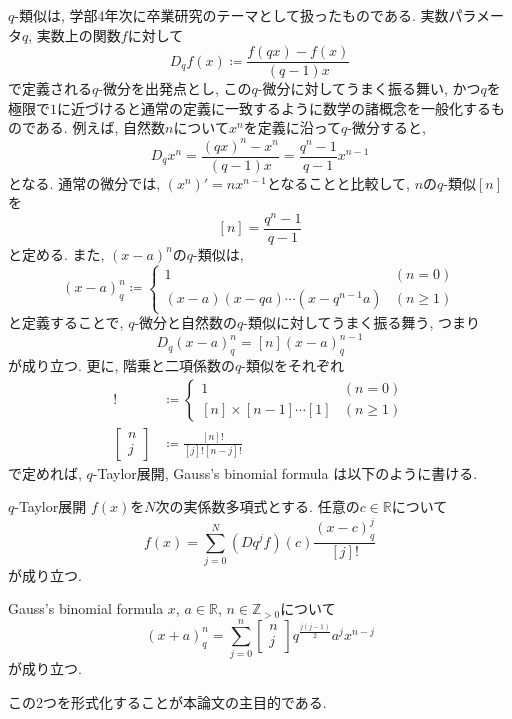\documentclass[11pt]{jsreport}
\theoremstyle{mystyle}
\newcommand{\Z}{\mathbb{Z}}
\newcommand{\R}{\mathbb{R}}
\newcommand{\qcoe}[2]{\left[\begin{array}{ccc}#1\\#2\end{array}\right]}
\newcommand{\0}{\textbf{0}}
\newcommand{\1}{\textbf{1}}
\newcommand{\2}{\textbf{2}}
\begin{document}
$q$-類似は, 学部4年次に卒業研究のテーマとして扱ったものである. 実数パラメータ$q$, 実数上の関数$f$に対して
\[
  D_q f(x) \coloneqq \frac{f(qx) - f(x)}{(q - 1) x}
\]
で定義される$q$-微分を出発点とし, この$q$-微分に対してうまく振る舞い, かつ$q$を極限で$1$に近づけると通常の定義に一致するように数学の諸概念を一般化するものである.
例えば, 自然数$n$について$x^n$を定義に沿って$q$-微分すると, 
\[
  D_q x^n = \frac{(qx)^n - x^n}{(q - 1) x} = \frac{q^n - 1}{q - 1} x^{n - 1}
\]
となる. 通常の微分では, $(x^n)' = n x^{n - 1}$となることと比較して, $n$の$q$-類似$[n]$を
\[
  [n] = \frac{q^n - 1}{q - 1}
\]
と定める. また, $(x - a)^n$の$q$-類似は, 
\[
  (x - a)^n_q \coloneqq \begin{cases}
                                  1 & (n = 0) \\
                                  (x - a) (x - qa) \cdots (x - q^{n - 1} a) & (n \ge 1)
                                \end{cases}
\]
と定義することで, $q$-微分と自然数の$q$-類似に対してうまく振る舞う, つまり
\[
  D_q (x - a)^n_q = [n](x - a)^{n - 1}_q
\]
が成り立つ. 更に, 階乗と二項係数の$q$-類似をそれぞれ
\begin{align*}
  [n]! &\coloneqq \begin{cases}
                        1 & (n = 0)\\
                        [n] \times [n   - 1] \cdots [1] & (n \ge 1)
                      \end{cases}\\
  \qcoe{n}{j} &\coloneqq \frac{[n]!}{[j]![n - j]!}
\end{align*}
で定めれば, $q$-Taylor展開, Gauss's binomial formula は以下のように書ける. 
\begin{itembox}{$q$-Taylor展開}
  $f(x)$を$N$次の実係数多項式とする. 任意の$c \in \R$について
  \[
    f(x) = \sum_{j = 0}^N (Dq^j f) (c) \frac{(x - c)^j_q}{[j]!}
  \]
  が成り立つ. 
\end{itembox}
\begin{itembox}{Gauss's binomial formula}
  $x$, $a \in \R$, $n \in \Z_{>0}$について
  \[
    (x+a)^n_q = \sum_{j=0}^n \qcoe{n}{j} q^{\frac{j(j-1)}{2}} a^j x^{n-j}
  \]
  が成り立つ. 
\end{itembox}
この2つを形式化することが本論文の主目的である. 
\end{document}
